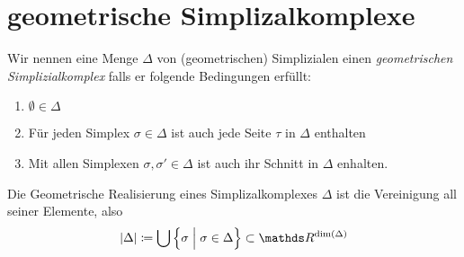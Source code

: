 
\section{geometrische Simplizalkomplexe}

\begin{Def}
	Wir nennen eine Menge $\Delta$ von (geometrischen) Simplizialen einen \textit{geometrischen Simplizialkomplex}
	falls er folgende Bedingungen erfüllt:
	\begin{enumerate}[(K1)]
		\item $\emptyset \in \Delta$
		\item Für jeden Simplex $\sigma \in \Delta$ ist auch jede Seite
		$\tau$ in $\Delta$ enthalten
		\item Mit allen Simplexen $\sigma, \sigma' \in \Delta$ ist auch ihr
		Schnitt in $\Delta$ enhalten.
	\end{enumerate}
\end{Def}





\begin{Def}
	Die Geometrische Realisierung eines Simplizalkomplexes $\Delta$ ist
	die Vereinigung all seiner Elemente, also
	\begin{gather*}
	|\Delta| \coloneqq \bigcup \left\{ \sigma \; \Big| \; \sigma \in
	\Delta \right\} \subset \R^{\dim(\Delta)}
	\end{gather*}
\end{Def}









